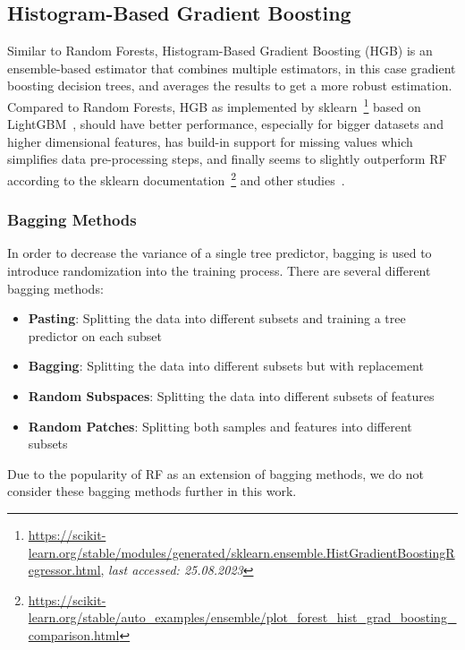 \subsection{Histogram-Based Gradient Boosting}

Similar to Random Forests, Histogram-Based Gradient Boosting (HGB) is an ensemble-based estimator that combines multiple estimators, in this case gradient boosting decision trees, and averages the results to get a more robust estimation. Compared to Random Forests, HGB as implemented by sklearn~\footnote{\url{https://scikit-learn.org/stable/modules/generated/sklearn.ensemble.HistGradientBoostingRegressor.html}, \textit{last accessed: 25.08.2023}} based on LightGBM~\cite{ke2017lightgbm}, should have better performance, especially for bigger datasets and higher dimensional features, has build-in support for missing values which simplifies data pre-processing steps, and finally seems to slightly outperform RF according to the sklearn documentation~\footnote{\url{https://scikit-learn.org/stable/auto\_examples/ensemble/plot\_forest\_hist\_grad\_boosting\_comparison.html}} and other studies~\cite{apaydin2022evaluation}.

\subsubsection{Bagging Methods}

In order to decrease the variance of a single tree predictor, bagging is used to introduce randomization into the training process. There are several different bagging methods:

\begin{itemize}
    \item \textbf{Pasting}: Splitting the data into different subsets and training a tree predictor on each subset~\cite{breiman1999pasting}
    \item \textbf{Bagging}: Splitting the data into different subsets but with replacement~\cite{breiman1996bagging}
    \item \textbf{Random Subspaces}: Splitting the data into different subsets of features~\cite{ho1998random}
    \item \textbf{Random Patches}: Splitting both samples and features into different subsets~\cite{louppe2012ensembles}
\end{itemize}

Due to the popularity of RF as an extension of bagging methods, we do not consider these bagging methods further in this work.

